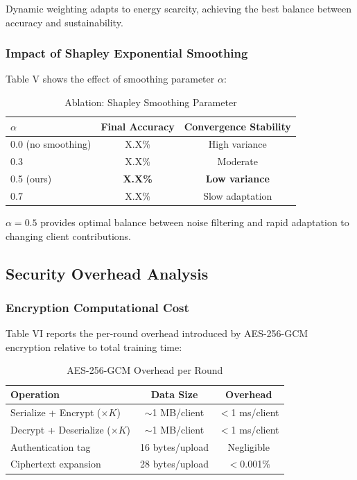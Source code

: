 Dynamic weighting adapts to energy scarcity, achieving the best balance between accuracy and sustainability.

\subsubsection{Impact of Shapley Exponential Smoothing}

Table V shows the effect of smoothing parameter $\alpha$:

\begin{table}[h]
\centering
\caption{Ablation: Shapley Smoothing Parameter}
\begin{tabular}{lcc}
\hline
\textbf{$\alpha$} & \textbf{Final Accuracy} & \textbf{Convergence Stability} \\
\hline
0.0 (no smoothing) & X.X\% & High variance \\
0.3 & X.X\% & Moderate \\
0.5 (ours) & \textbf{X.X\%} & \textbf{Low variance} \\
0.7 & X.X\% & Slow adaptation \\
\hline
\end{tabular}
\end{table}

$\alpha=0.5$ provides optimal balance between noise filtering and rapid adaptation to changing client contributions.

\subsection{Security Overhead Analysis}

\subsubsection{Encryption Computational Cost}

Table VI reports the per-round overhead introduced by AES-256-GCM encryption relative to total training time:

\begin{table}[h]
\centering
\caption{AES-256-GCM Overhead per Round}
\begin{tabular}{lcc}
\hline
\textbf{Operation} & \textbf{Data Size} & \textbf{Overhead} \\
\hline
Serialize + Encrypt ($\times K$) & $\sim$1 MB/client & $<$1 ms/client \\
Decrypt + Deserialize ($\times K$) & $\sim$1 MB/client & $<$1 ms/client \\
Authentication tag & 16 bytes/upload & Negligible \\
Ciphertext expansion & 28 bytes/upload & $<$0.001\% \\
\hline
\end{tabular}
\end{table}

